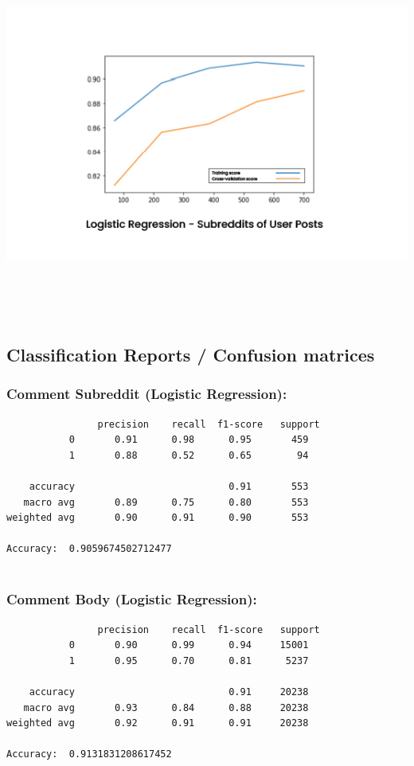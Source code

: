 \documentclass{article}
\begin{document}
    \includegraphics[width=13.5cm, height=9cm]{4}\\ \\ \\ \\

    \subsection{Classification Reports / Confusion matrices}
    \subsubsection{Comment Subreddit (Logistic Regression):}
    
     \begin{verbatim}
                precision    recall  f1-score   support
           0       0.91      0.98      0.95       459
           1       0.88      0.52      0.65        94

    accuracy                           0.91       553
   macro avg       0.89      0.75      0.80       553
weighted avg       0.90      0.91      0.90       553

Accuracy:  0.9059674502712477
 
 \end{verbatim}

    \subsubsection{Comment Body (Logistic Regression):}
    
     \begin{verbatim}
                precision    recall  f1-score   support
           0       0.90      0.99      0.94     15001
           1       0.95      0.70      0.81      5237

    accuracy                           0.91     20238
   macro avg       0.93      0.84      0.88     20238
weighted avg       0.92      0.91      0.91     20238

Accuracy:  0.9131831208617452
 
 \end{verbatim}
\end{document}
